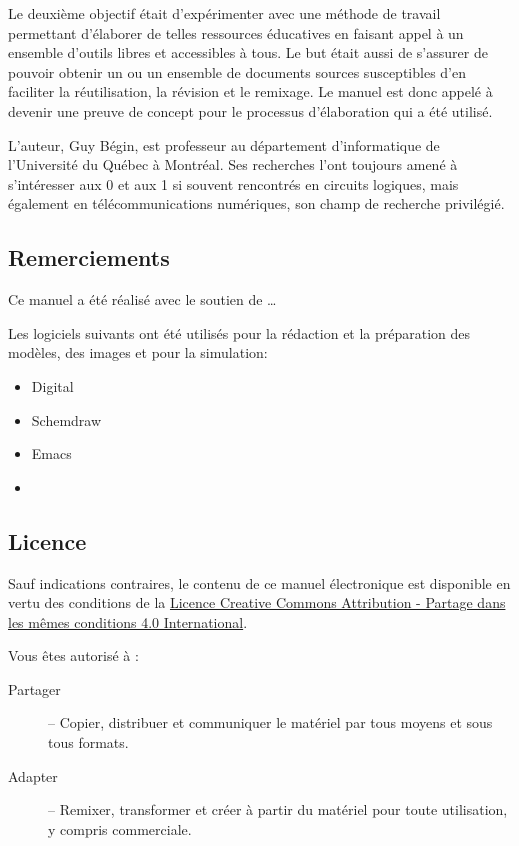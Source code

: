 \documentclass[11pt]{article}
\begin{document}
Le deuxième objectif était d'expérimenter avec une méthode de
travail permettant d'élaborer de telles ressources éducatives en
faisant appel à un ensemble d'outils libres et accessibles à tous. Le
but était aussi de s'assurer de pouvoir obtenir un ou un ensemble de
documents sources susceptibles d'en faciliter la réutilisation, la
révision et le remixage. Le manuel est donc appelé à devenir une
preuve de concept pour le processus d'élaboration qui a été utilisé.

L'auteur, Guy Bégin, est professeur au département d'informatique de
l'Université du Québec à Montréal. Ses recherches l'ont toujours amené
à s'intéresser aux 0 et aux 1 si souvent rencontrés en circuits
logiques, mais également en télécommunications numériques, son champ
de recherche privilégié.

\subsection*{Remerciements}
\label{sec:org498f30b}

Ce manuel a été réalisé avec le soutien de \ldots{}

Les logiciels suivants ont été utilisés pour la rédaction et la
préparation des modèles, des images et pour la simulation:

\begin{itemize}
\item Digital
\item Schemdraw
\item Emacs
\item 
\end{itemize}

\subsection*{Licence}
\label{sec:orgffa7fa9}

\begin{center}

\end{center}

Sauf indications contraires, le contenu de ce manuel électronique est
disponible en vertu des conditions de la
\href{https://creativecommons.org/licenses/by/4.0/deed.fr}{Licence
Creative Commons Attribution - Partage dans les mêmes conditions 4.0
International}.

Vous êtes autorisé à : 

\begin{description}
\item[{Partager}] – Copier, distribuer et communiquer le matériel par tous
moyens et sous tous formats.
\item[{Adapter}] – Remixer, transformer et créer à partir du matériel pour
toute utilisation, y compris commerciale.
\end{description}
\end{document}
